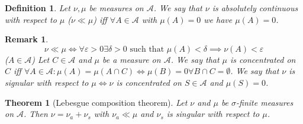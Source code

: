 \documentclass{article}
\newtheorem{theorem}{Theorem}  \numberwithin{theorem}{section}
\newtheorem{definition}{Definition}  \numberwithin{definition}{section}
\newtheorem{remark}{Remark}  \numberwithin{remark}{section}
\begin{document}
\begin{definition}
  Let $\nu, \mu$ be measures on $\mathcal A$. We say that $\nu$ is absolutely continuous with respect to $\mu$ ($\nu \ll \mu$)
  iff $\forall A \in \mathcal A$ with $\mu(A) = 0$ we have $\mu(A) = 0$.
\end{definition}

\begin{remark}
  \[ \nu \ll \mu \iff \forall \varepsilon > 0 \exists \delta > 0 \text{ such that } \mu(A) < \delta \implies \nu(A) < \varepsilon \]
  ($A \in \mathcal A$)
  Let $C \in \mathcal A$ and $\mu$ be a measure on $\mathcal A$.
  We say that $\mu$ is concentrated on $C$ iff $\forall A \in \mathcal A: \mu(A) = \mu(A \cap C) \iff \mu(B) = 0 \forall B \cap C = \emptyset$.
  We say that $\nu$ is signular with respect to $\mu \iff \nu$ is concentrated on $S \in \mathcal A$ and $\mu(S) = 0$.
\end{remark}

\begin{theorem}[Lebesgue composition theorem]
  Let $\nu$ and $\mu$ be $\sigma$-finite measures on $\mathcal A$.
  Then $\nu = \nu_a + \nu_s$ with $\nu_a \ll \mu$ and $\nu_s$ is singular with respect to $\mu$.
\end{theorem}
\end{document}
